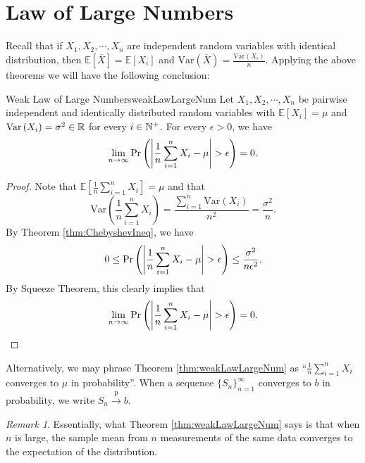 \documentclass[math]{amznotes}
\theoremstyle{remark}
\newtheorem*{remark}{Remark}
\newcommand{\0}{\mathbf{0}}
\newcommand{\1}{\mathbf{1}}
\begin{document}
\section{Law of Large Numbers}
Recall that if $X_1, X_2, \cdots, X_n$ are independent random variables with identical distribution, then $\mathbb{E}\left[\overline{X}\right] = \mathbb{E}[X_i]$ and $\mathrm{Var}\left(\overline{X}\right) = \frac{\mathrm{Var}(X_i)}{n}$. Applying the above theorems we will have the following conclusion:
\begin{thmbox}{Weak Law of Large Numbers}{weakLawLargeNum}
    Let $X_1, X_2, \cdots, X_n$ be pairwise independent and identically distributed random variables with $\mathbb{E}[X_i] = \mu$ and $\mathrm{Var}\left(X_i\right) = \sigma^2 \in \mathbb{R}$ for every $i \in \mathbb{N}^+$. For every $\epsilon > 0$, we have 
    \begin{equation*}
        \lim_{n \to \infty}\mathrm{Pr}\left({\left\lvert {\frac{1}{n}\sum_{i = 1}^nX_i - \mu} \right\rvert} > \epsilon\right) = 0.
    \end{equation*}
    \tcblower
    \begin{proof}
        Note that $\mathbb{E}\left[\frac{1}{n}\sum_{i = 1}^nX_i\right] = \mu$ and that 
        \begin{equation*}
            \mathrm{Var}\left(\frac{1}{n}\sum_{i = 1}^nX_i\right) = \frac{\sum_{i = 1}^{n}\mathrm{Var}\left(X_i\right)}{n^2} = \frac{\sigma^2}{n}.
        \end{equation*}
        By Theorem \ref{thm:ChebyshevIneq}, we have 
        \begin{equation*}
            0 \leq \mathrm{Pr}\left({\left\lvert {\frac{1}{n}\sum_{i = 1}^nX_i - \mu} \right\rvert} > \epsilon\right) \leq \frac{\sigma^2}{n\epsilon^2}.
        \end{equation*}
        By Squeeze Theorem, this clearly implies that 
        \begin{equation*}
            \lim_{n \to \infty}\mathrm{Pr}\left({\left\lvert {\frac{1}{n}\sum_{i = 1}^nX_i - \mu} \right\rvert} > \epsilon\right) = 0.
        \end{equation*}
    \end{proof}
\end{thmbox}
Alternatively, we may phrase Theorem \ref{thm:weakLawLargeNum} as ``$\frac{1}{n}\sum_{i = 1}^nX_i$ converges to $\mu$ in probability''. When a sequence $\{S_n\}_{n = 1}^{\infty}$ converges to $b$ in probability, we write $S_n \xrightarrow{\mathrm{p}} b$. 
\begin{notebox}
    \begin{remark}
        Essentially, what Theorem \ref{thm:weakLawLargeNum} says is that when $n$ is large, the sample mean from $n$ measurements of the same data converges to the expectation of the distribution.
    \end{remark}
\end{notebox}
\end{document}

